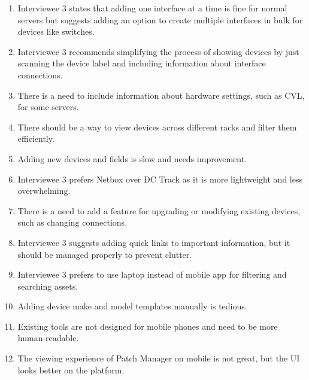 \begin{enumerate}
    \item Interviewee 3 states that adding one interface at a time is fine for normal servers but suggests adding an option to create multiple interfaces in bulk for devices like switches.
    \item Interviewee 3 recommends simplifying the process of showing devices by just scanning the device label and including information about interface connections.
    \item There is a need to include information about hardware settings, such as CVL, for some servers.
    \item There should be a way to view devices across different racks and filter them efficiently.
    \item Adding new devices and fields is slow and needs improvement.
    \item Interviewee 3 prefers Netbox over DC Track as it is more lightweight and less overwhelming.
    \item There is a need to add a feature for upgrading or modifying existing devices, such as changing connections.
    \item Interviewee 3 suggests adding quick links to important information, but it should be managed properly to prevent clutter.
    \item Interviewee 3 prefers to use laptop instead of mobile app for filtering and searching assets.
    \item Adding device make and model templates manually is tedious.
    \item Existing tools are not designed for mobile phones and need to be more human-readable.
    \item The viewing experience of Patch Manager on mobile is not great, but the UI looks better on the platform.
\end{enumerate}
